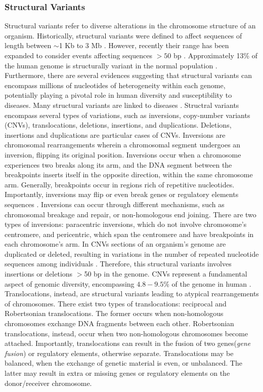 \documentclass[a4paper, titlepage, openright]{book}
\begin{document}
\subsubsection{Structural Variants}
Structural variants refer to diverse alterations in the chromosome structure of an organism. Historically, structural variants were defined to affect sequences of length between $\sim$1 Kb to 3 Mb \citep{feuk2006structural}. However, recently their range has been expanded to consider events affecting sequences $>50$ bp \citep{alkan2011genome}. Approximately 13\% of the human genome is structurally variant in the normal population \citep{sudmant2015integrated}. Furthermore, there are several evidences suggesting that structural variants can encompass millions of nucleotides of heterogeneity within each genome, potentially playing a pivotal role in human diversity and susceptibility to diseases. Many structural variants are linked to diseases \citep{lakich1993inversions}. Structral variants encompass several types of variations, such as inversions, copy-number variants (CNVs), translocations, deletions, insertions, and duplications. Deletions, insertions and duplications are particular cases of CNVs.  Inversions are chromosomal rearrangements wherein a chromosomal segment undergoes an inversion, flipping its original position. Inversions occur when a chromosome experiences two breaks along its arm, and the DNA segment between the breakpoints inserts itself in the opposite direction, within the same chromosome arm. Generally, breakpoints occur in regions rich of repetitive nucleotides. Importantly, inversions may flip or even break genes or regulatory elements sequences \citep{puig2015human}. Inversions can occur through different mechanisms, such as chromosomal breakage and repair, or non-homologous end joining. There are two types of inversions: paracentric inversions, which do not involve chromosome's centromere, and pericentric, which span the centromere and have breakpoints in each chromosome's arm. In CNVs sections of an organism's genome are duplicated or deleted, resulting in variations in the number of repeated nucleotide sequences among individuals \citep{mccarroll2007copy, alkan2011genome}. Therefore, this structural variants involves insertions or deletions $>$50 bp in the genome. CNVs represent a fundamental aspect of genomic diversity, encompassing $4.8-9.5\%$ of the genome in human \citep{zarrei2015copy}. Translocations, instead, are structural variants leading to atypical rearrangements of chromosomes. There exist two types of translocations: reciprocal and Robertsonian translocations. The former occurs when non-homologous chromosomes exchange DNA fragments between each other. Robertsonian translocations, instead, occur when two non-homologous chromosomes become attached. Importantly, translocations can result in the fusion of two genes(\emph{gene fusion}) or regulatory elements, otherwise separate. Translocations may be balanced, when the exchange of genetic material is even, or unbalanced. The latter may result in extra or missing genes or regulatory elements on the donor/receiver chromosome. 
\end{document}
